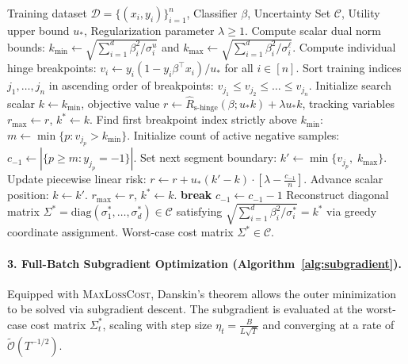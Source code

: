 \documentclass[10pt, letterpaper]{article}
\newcommand{\C}{\mathcal{C}}
\newcommand{\D}{\mathcal{D}}
\newcommand{\diag}{\text{diag}}
\newcommand{\Rshingehat}{\hat{R}_{\text{s-hinge}}}
\begin{document}
\begin{algorithm}[H]
\caption{\textsc{MaxLossCost} Breakpoint Sweep \cite{rosenfeld2024oneshot}}
\label{alg:maxlosscost}
\begin{algorithmic}[1]
\Require Training dataset $\D = \{(x_i, y_i)\}_{i=1}^n$, Classifier $\beta$, Uncertainty Set $\C$, Utility upper bound $u_*$, Regularization parameter $\lambda \ge 1$.
\State Compute scalar dual norm bounds: $k_{\min} \leftarrow \sqrt{\sum_{i=1}^d \beta_i^2 / \sigma_i^u}$ and $k_{\max} \leftarrow \sqrt{\sum_{i=1}^d \beta_i^2 / \sigma_i^\ell}$.
\State Compute individual hinge breakpoints: $v_i \leftarrow y_i(1 - y_i \beta^\top x_i) / u_*$ for all $i \in [n]$.
\State Sort training indices $j_1, \dots, j_n$ in ascending order of breakpoints: $v_{j_1} \le v_{j_2} \le \dots \le v_{j_n}$.
\State Initialize search scalar $k \leftarrow k_{\min}$, objective value $r \leftarrow \Rshingehat(\beta; u_* k) + \lambda u_* k$, tracking variables $r_{\max} \leftarrow r$, $k^* \leftarrow k$.
\State Find first breakpoint index strictly above $k_{\min}$: $m \leftarrow \min \{ p : v_{j_p} > k_{\min} \}$.
\State Initialize count of active negative samples: $c_{-1} \leftarrow |\{ p \ge m : y_{j_p} = -1 \}|$.
    \State Set next segment boundary: $k' \leftarrow \min\{ v_{j_p}, \; k_{\max} \}$.
    \State Update piecewise linear risk: $r \leftarrow r + u_* (k' - k) \cdot \left[ \lambda - \frac{c_{-1}}{n} \right]$.
    \State Advance scalar position: $k \leftarrow k'$.
        \State $r_{\max} \leftarrow r$, \quad $k^* \leftarrow k$.
    \EndIf
     \textbf{break} \EndIf
     $c_{-1} \leftarrow c_{-1} - 1$ \EndIf
\EndFor
\State Reconstruct diagonal matrix $\Sigma^* = \diag(\sigma_1^*, \dots, \sigma_d^*) \in \C$ satisfying $\sqrt{\sum_{i=1}^d \beta_i^2 / \sigma_i^*} = k^*$ via greedy coordinate assignment.
\State \Return Worst-case cost matrix $\Sigma^* \in \C$.
\end{algorithmic}
\end{algorithm}

\paragraph{3. Full-Batch Subgradient Optimization (Algorithm~\ref{alg:subgradient}).} Equipped with \textsc{MaxLossCost}, Danskin's theorem allows the outer minimization to be solved via subgradient descent. The subgradient is evaluated at the worst-case cost matrix $\Sigma_t^*$, scaling with step size $\eta_t = \frac{B}{L\sqrt{T}}$ and converging at a rate of $\tilde{\mathcal{O}}(T^{-1/2})$.
\end{document}
